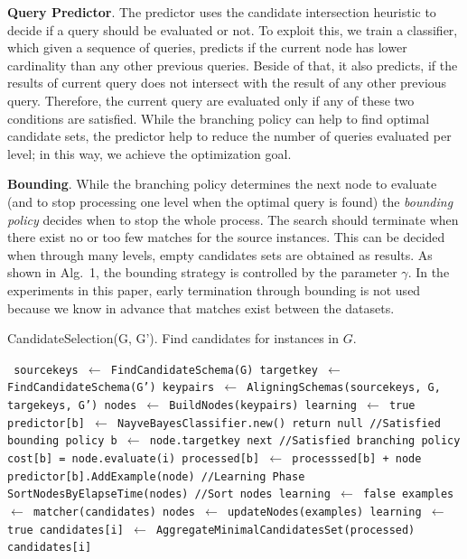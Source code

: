 \textbf{Query Predictor}. 
The predictor uses the candidate intersection heuristic to decide if a query should be evaluated or not. To exploit this, we train a classifier, which given a sequence of queries, predicts if the current node has lower cardinality than any other previous queries. Beside of that, it also predicts, if the results of current query does not intersect with the result of any other previous query. Therefore, the current query are evaluated only if any of these two conditions are satisfied.  While the branching policy can help to find optimal candidate sets, the predictor help to reduce the number of queries evaluated per level; in this way, we achieve the optimization goal.

\textbf{Bounding}. While the branching policy determines the next node to evaluate (and to stop processing one level when the optimal query is found)  the \emph{bounding policy} decides when to stop the whole process. The search should terminate when there exist no or too few matches for the source instances. This can be decided when through many levels, empty candidates sets are obtained as results. As shown in Alg.~1, the bounding strategy is 
controlled by the parameter $\gamma$. In the experiments in this paper, early termination through bounding is not used because we know in advance that matches exist between the datasets. 
\begin{algorithm}
\caption{CandidateSelection(G, G'). Find candidates for instances in $G$.}
\begin{algorithmic}
\scriptsize\tt
\STATE  sourcekeys  $\leftarrow$ FindCandidateSchema(G)
\STATE  targetkey  $\leftarrow$ FindCandidateSchema(G')
\STATE  keypairs  $\leftarrow$ AligningSchemas(sourcekeys, G, targekeys, G') 
\STATE  nodes  $\leftarrow$ BuildNodes(keypairs) 
\STATE  learning  $\leftarrow$ true
\STATE predictor[b] $\leftarrow$ NayveBayesClassifier.new()
\ENDFOR 
{} %
\STATE  return null //Satisfied bounding policy
\ENDIF
{}  
\STATE  b $\leftarrow$ node.targetkey
\STATE next //Satisfied branching policy 
\ENDIF
{}  
\STATE  cost[b] = node.evaluate(i) 
\STATE  processed[b] $\leftarrow$  processsed[b] + node 
\STATE    predictor[b].AddExample(node) //Learning Phase
\ENDIF 
\ENDIF 
\ENDFOR
{} 
\STATE    SortNodesByElapseTime(nodes)  //Sort nodes 
\ENDIF
{} 
\STATE    learning $\leftarrow$ false
\ENDIF
{} 
\STATE  examples  $\leftarrow$ matcher(candidates)
\STATE  nodes  $\leftarrow$ updateNodes(examples) 
\STATE    learning $\leftarrow$ true
\ENDIF
\STATE  candidates[i] $\leftarrow$ AggregateMinimalCandidatesSet(processed)
\ENDFOR 
\RETURN candidates[i]
\end{algorithmic}
\end{algorithm}

